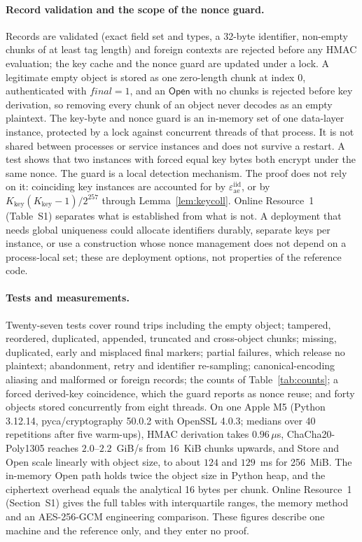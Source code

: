 \documentclass[pdflatex,sn-mathphys-num]{sn-jnl}%
\theoremstyle{plain}
\theoremstyle{definition}
\begin{document}
\paragraph{Record validation and the scope of the nonce guard.}
Records are validated (exact field set and types, a 32-byte identifier, non-empty chunks of at least tag length) and foreign contexts are rejected before any HMAC evaluation; the key cache and the nonce guard are updated under a lock. A legitimate empty object is stored as one zero-length chunk at index $0$, authenticated with $\mathit{final}=1$, and an $\mathsf{Open}$ with no chunks is rejected before key derivation, so removing every chunk of an object never decodes as an empty plaintext. The key-byte and nonce guard is an in-memory set of one data-layer instance, protected by a lock against concurrent threads of that process. It is not shared between processes or service instances and does not survive a restart. A test shows that two instances with forced equal key bytes both encrypt under the same nonce. The guard is a local detection mechanism. The proof does not rely on it: coinciding key instances are accounted for by $\varepsilon^{\mathrm{iid}}_{\mathrm{ae}}$, or by $K_{\mathrm{key}}(K_{\mathrm{key}}-1)/2^{257}$ through Lemma~\ref{lem:keycoll}. Online Resource~1 (Table~S1) separates what is established from what is not. A deployment that needs global uniqueness could allocate identifiers durably, separate keys per instance, or use a construction whose nonce management does not depend on a process-local set; these are deployment options, not properties of the reference code.


\paragraph{Tests and measurements.}
Twenty-seven tests cover round trips including the empty object; tampered, reordered, duplicated, appended, truncated and cross-object chunks; missing, duplicated, early and misplaced final markers; partial failures, which release no plaintext; abandonment, retry and identifier re-sampling; canonical-encoding aliasing and malformed or foreign records; the counts of Table~\ref{tab:counts}; a forced derived-key coincidence, which the guard reports as nonce reuse; and forty objects stored concurrently from eight threads. On one Apple M5 (Python 3.12.14, pyca/cryptography 50.0.2 with OpenSSL 4.0.3; medians over 40 repetitions after five warm-ups), HMAC derivation takes $0.96\,\mu$s, ChaCha20-Poly1305 reaches $2.0$--$2.2$~GiB/s from 16~KiB chunks upwards, and Store and Open scale linearly with object size, to about $124$ and $129$~ms for 256~MiB. The in-memory Open path holds twice the object size in Python heap, and the ciphertext overhead equals the analytical 16 bytes per chunk. Online Resource~1 (Section~S1) gives the full tables with interquartile ranges, the memory method and an AES-256-GCM engineering comparison. These figures describe one machine and the reference only, and they enter no proof.
\end{document}

